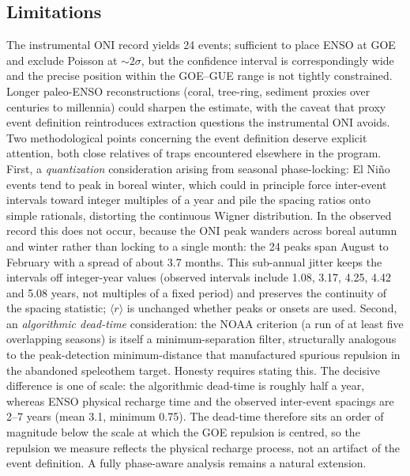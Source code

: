 \documentclass[12pt,a4paper]{article}
\begin{document}
\subsection{Limitations}
The instrumental ONI record yields 24 events; sufficient to place ENSO at GOE and exclude Poisson at $\sim2\sigma$, but the confidence interval is correspondingly wide and the precise position within the GOE--GUE range is not tightly constrained. Longer paleo-ENSO reconstructions (coral, tree-ring, sediment proxies over centuries to millennia) could sharpen the estimate, with the caveat that proxy event definition reintroduces extraction questions the instrumental ONI avoids. Two methodological points concerning the event definition deserve explicit attention, both close relatives of traps encountered elsewhere in the program. First, a \emph{quantization} consideration arising from seasonal phase-locking: El Ni\~no events tend to peak in boreal winter, which could in principle force inter-event intervals toward integer multiples of a year and pile the spacing ratios onto simple rationals, distorting the continuous Wigner distribution. In the observed record this does not occur, because the ONI peak wanders across boreal autumn and winter rather than locking to a single month: the 24 peaks span August to February with a spread of about 3.7 months. This sub-annual jitter keeps the intervals off integer-year values (observed intervals include 1.08, 3.17, 4.25, 4.42 and 5.08 years, not multiples of a fixed period) and preserves the continuity of the spacing statistic; $\langle r\rangle$ is unchanged whether peaks or onsets are used. Second, an \emph{algorithmic dead-time} consideration: the NOAA criterion (a run of at least five overlapping seasons) is itself a minimum-separation filter, structurally analogous to the peak-detection minimum-distance that manufactured spurious repulsion in the abandoned speleothem target. Honesty requires stating this. The decisive difference is one of scale: the algorithmic dead-time is roughly half a year, whereas ENSO physical recharge time and the observed inter-event spacings are 2--7 years (mean 3.1, minimum 0.75). The dead-time therefore sits an order of magnitude below the scale at which the GOE repulsion is centred, so the repulsion we measure reflects the physical recharge process, not an artifact of the event definition. A fully phase-aware analysis remains a natural extension.
\end{document}

